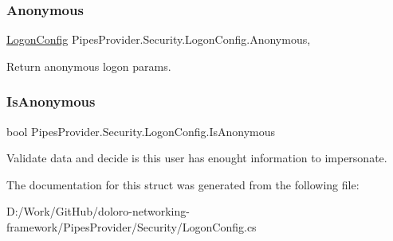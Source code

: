 \subsubsection{\texorpdfstring{Anonymous}{Anonymous}}
{\footnotesize\ttfamily \mbox{\hyperlink{struct_pipes_provider_1_1_security_1_1_logon_config}{Logon\+Config}} Pipes\+Provider.\+Security.\+Logon\+Config.\+Anonymous\hspace{0.3cm}{\ttfamily [static]}, {\ttfamily [get]}}



Return anonymous logon params. 

\mbox{\label{struct_pipes_provider_1_1_security_1_1_logon_config_a75522f37bf91bbd20f01fa4498d28dd1}} 
\subsubsection{\texorpdfstring{Is\+Anonymous}{IsAnonymous}}
{\footnotesize\ttfamily bool Pipes\+Provider.\+Security.\+Logon\+Config.\+Is\+Anonymous\hspace{0.3cm}{\ttfamily [get]}}



Validate data and decide is this user has enought information to impersonate. 



The documentation for this struct was generated from the following file\+:\begin{DoxyCompactItemize}
\item 
D\+:/\+Work/\+Git\+Hub/doloro-\/networking-\/framework/\+Pipes\+Provider/\+Security/Logon\+Config.\+cs\end{DoxyCompactItemize}

